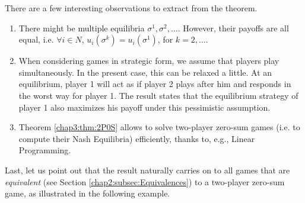 There are a few interesting observations to extract from the theorem.
\begin{enumerate}
\item There might be multiple equilibria $\sigma^1, \sigma^2, \ldots$. However, their payoffs are all equal, i.e. $\forall i \in N$, $u_i(\sigma^k) = u_i(\sigma^1)$, for $k = 2, \ldots$.
\item When considering games in strategic form, we assume that players play simultaneously. In the present case, this can be relaxed a little. At an equilibrium, player 1 will act as if player 2 plays after him and responds in the worst way for player 1. The result states that the equilibrium strategy of player 1 also maximizes his payoff under this pessimistic assumption.
\item Theorem \ref{chap3:thm:2P0S} allows to solve two-player zero-sum games (i.e. to compute their Nash Equilibria) efficiently, thanks to, e.g., Linear Programming.
\end{enumerate}
\label{chap:NE}

Last, let us point out that the result naturally
carries on to all games that are \emph{equivalent} (see Section \ref{chap2:subsec:Equivalences}) to a two-player zero-sum game, as illustrated in the following example.


